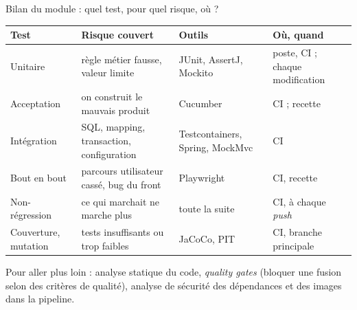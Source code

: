 \documentclass[aspectratio=169,10pt]{beamer}
\begin{document}

\begin{frame}{Bilan du module : quel test, pour quel risque, où ?}
  \footnotesize
  \begin{datacard}
    \begin{tabular}{@{}p{2.5cm}p{4.1cm}p{2.7cm}p{2.9cm}@{}}
      \toprule
      \textbf{Test} & \textbf{Risque couvert} & \textbf{Outils} & \textbf{Où, quand} \\
      \midrule
      Unitaire & règle métier fausse, valeur limite & JUnit, AssertJ, Mockito & poste, CI ; chaque modification \\[0.5mm]
      Acceptation & on construit le mauvais produit & Cucumber & CI ; recette \\[0.5mm]
      Intégration & SQL, mapping, transaction, configuration & Testcontainers, Spring, MockMvc & CI \\[0.5mm]
      Bout en bout & parcours utilisateur cassé, bug du front & Playwright & CI, recette \\[0.5mm]
      Non-régression & ce qui marchait ne marche plus & toute la suite & CI, à chaque \textit{push} \\[0.5mm]
      Couverture, mutation & tests insuffisants ou trop faibles & JaCoCo, PIT & CI, branche principale \\
      \bottomrule
    \end{tabular}
  \end{datacard}
  \vspace{1mm}
  \small Pour aller plus loin : analyse statique du code, \textit{quality gates} (bloquer une fusion selon des critères de qualité), analyse de sécurité des dépendances et des images dans la pipeline.
\end{frame}
\end{document}
